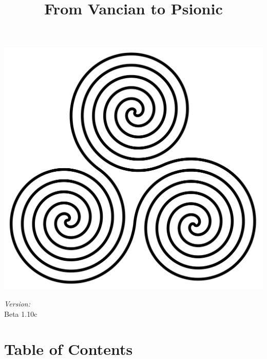 \documentclass[a4paper,10pt]{article}
\title{From Vancian to Psionic}
\date{}
\author{}
\begin{document}
\begin{titlepage}
\maketitle
\thispagestyle{empty}
\includegraphics[width=\textwidth]{Pics/TripleSpiral.png}
\vfill
\begin{flushright} \large
\emph{Version:} \\
Beta 1.10c
\end{flushright}
\end{titlepage}
\section{Table of Contents}
\setlength{\columnsep}{0.5in}
\begin{multicols}{2}
\scriptsize
\tableofcontents
\listoftables
\listoffigures
\normalsize
\end{multicols}
\newpage
\begin{multicols}{2}
 \newpage
 \newpage
 \newpage
 \newpage
\newpage

\newpage
\newpage
\newpage
\newpage
\newpage

\end{multicols}
\end{document}
